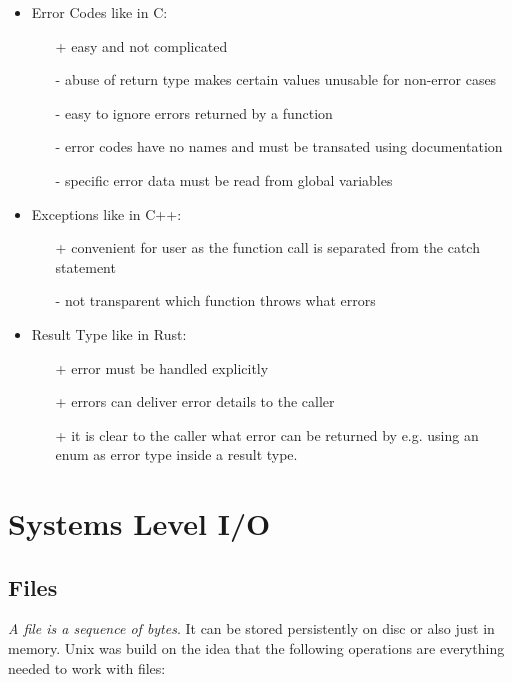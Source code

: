     \begin{itemize}
        \item Error Codes like in C:
              \begin{itemize}
                  \item[+] easy and not complicated
                  \item[-] abuse of return type makes certain values unusable for non-error cases
                  \item[-] easy to ignore errors returned by a function
                  \item[-] error codes have no names and must be transated using documentation
                  \item[-] specific error data must be read from global variables
              \end{itemize}
        \item Exceptions like in C++:
              \begin{itemize}
                  \item[+] convenient for user as the function call is separated from the catch statement
                  \item[-] not transparent which function throws what errors
              \end{itemize}
        \item Result Type like in Rust:
              \begin{itemize}
                  \item[+] error must be handled explicitly
                  \item[+] errors can deliver error details to the caller
                  \item[+] it is clear to the caller what error can be returned by e.g. using an enum as error type inside a result type.
              \end{itemize}
    \end{itemize}


    \section{Systems Level I/O}

    \subsection{Files}

    \textit{A file is a sequence of bytes}. It can be stored persistently on disc or also just in memory. Unix was build on the idea that the following operations are everything needed to work with files:

